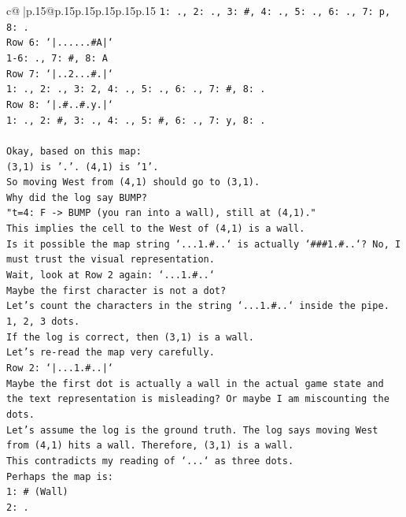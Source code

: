 \documentclass{article}
\begin{document}
{\begin{supertabular}{c@{$\;$}|p{.15\linewidth}@{}p{.15\linewidth}p{.15\linewidth}p{.15\linewidth}p{.15\linewidth}p{.15\linewidth}}
{{{\texttt{1: ., 2: ., 3: \#, 4: ., 5: ., 6: ., 7: p, 8: .} \\
\texttt{Row 6: `|......\#A|`} \\
\texttt{1{-}6: ., 7: \#, 8: A} \\
\texttt{Row 7: `|..2...\#.|`} \\
\texttt{1: ., 2: ., 3: 2, 4: ., 5: ., 6: ., 7: \#, 8: .} \\
\texttt{Row 8: `|.\#..\#.y.|`} \\
\texttt{1: ., 2: \#, 3: ., 4: ., 5: \#, 6: ., 7: y, 8: .} \\
\\ 
\texttt{Okay, based on this map:} \\
\texttt{(3,1) is '.'. (4,1) is '1'.} \\
\texttt{So moving West from (4,1) should go to (3,1).} \\
\texttt{Why did the log say BUMP?} \\
\texttt{"t=4: F {-}> BUMP (you ran into a wall), still at (4,1)."} \\
\texttt{This implies the cell to the West of (4,1) is a wall.} \\
\texttt{Is it possible the map string `...1.\#..` is actually `\#\#\#1.\#..`? No, I must trust the visual representation.} \\
\texttt{Wait, look at Row 2 again: `...1.\#..`} \\
\texttt{Maybe the first character is not a dot?} \\
\texttt{Let's count the characters in the string `...1.\#..` inside the pipe.} \\
\texttt{1, 2, 3 dots.} \\
\texttt{If the log is correct, then (3,1) is a wall.} \\
\texttt{Let's re{-}read the map very carefully.} \\
\texttt{Row 2: `|...1.\#..|`} \\
\texttt{Maybe the first dot is actually a wall in the actual game state and the text representation is misleading? Or maybe I am miscounting the dots.} \\
\texttt{Let's assume the log is the ground truth. The log says moving West from (4,1) hits a wall. Therefore, (3,1) is a wall.} \\
\texttt{This contradicts my reading of `...` as three dots.} \\
\texttt{Perhaps the map is:} \\
\texttt{1: \# (Wall)} \\
\texttt{2: .} \\
}}}
\end{supertabular}}
\end{document}
